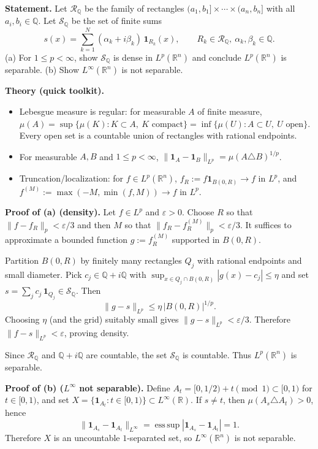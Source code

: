 \begin{problem}[CP-III-0010]
\label{prob:cp-iii-0010}
\textbf{Statement.}
	Let $\mathcal R_{\mathbb Q}$ be the family of rectangles $(a_1,b_1]\times\cdots\times(a_n,b_n]$ with all $a_i,b_i\in\mathbb Q$.
	Let $\mathcal S_{\mathbb Q}$ be the set of finite sums
	\[
	s(x)=\sum_{k=1}^{N}(\alpha_k+i\beta_k)\,\mathbf 1_{R_k}(x),
	\qquad R_k\in\mathcal R_{\mathbb Q},\ \alpha_k,\beta_k\in\mathbb Q.
	\]
	(a) For $1\le p<\infty$, show $\mathcal S_{\mathbb Q}$ is dense in $L^p(\mathbb R^n)$ and conclude $L^p(\mathbb R^n)$ is separable.
	(b) Show $L^\infty(\mathbb R^n)$ is not separable.


	\textbf{Theory (quick toolkit).}
	\begin{itemize}
		\item Lebesgue measure is regular: for measurable $A$ of finite measure,
		$\mu(A)=\sup\{\mu(K):K\subset A,\ K\text{ compact}\}=\inf\{\mu(U):A\subset U,\ U\text{ open}\}$.
		Every open set is a countable union of rectangles with rational endpoints.
		\item For measurable $A,B$ and $1\le p<\infty$,
		$\|\mathbf 1_A-\mathbf 1_B\|_{L^p}=\mu(A\triangle B)^{1/p}$.
		\item Truncation/localization: for $f\in L^p(\mathbb R^n)$, $f_R:=f\mathbf 1_{B(0,R)}\to f$ in $L^p$,
		and $f^{(M)}:=\max(-M,\min(f,M))\to f$ in $L^p$.
	\end{itemize}


	\textbf{Proof of (a) (density).}
	Let $f\in L^{p}$ and $\varepsilon>0$.
	Choose $R$ so that $\|f-f_R\|_{p}<\varepsilon/3$ and then $M$ so that $\|f_R-f_R^{(M)}\|_{p}<\varepsilon/3$.
	It suffices to approximate a bounded function $g:=f_R^{(M)}$ supported in $B(0,R)$.

	Partition $B(0,R)$ by finitely many rectangles $Q_j$ with rational endpoints and small diameter.
	Pick $c_j\in\mathbb Q+i\mathbb Q$ with $\sup_{x\in Q_j\cap B(0,R)}|g(x)-c_j|\le\eta$ and set
	$s=\sum_j c_j\,\mathbf 1_{Q_j}\in\mathcal S_{\mathbb Q}$.
	Then
	\[
	\|g-s\|_{L^p}\le \eta\,|B(0,R)|^{1/p}.
	\]
	Choosing $\eta$ (and the grid) suitably small gives $\|g-s\|_{L^p}<\varepsilon/3$.
	Therefore $\|f-s\|_{L^p}<\varepsilon$, proving density.

	Since $\mathcal R_{\mathbb Q}$ and $\mathbb Q+i\mathbb Q$ are countable, the set $\mathcal S_{\mathbb Q}$ is countable.
	Thus $L^p(\mathbb R^n)$ is separable.

	\medskip

	\textbf{Proof of (b) ($L^\infty$ not separable).}
	Define $A_t=[0,1/2)+t \pmod 1\subset[0,1)$ for $t\in[0,1)$, and set $X=\{\mathbf 1_{A_t}: t\in[0,1)\}\subset L^\infty(\mathbb R)$.
	If $s\ne t$, then $\mu(A_s\triangle A_t)>0$, hence
	\[
	\|\mathbf 1_{A_s}-\mathbf 1_{A_t}\|_{L^\infty}
	= \operatorname*{ess\,sup} |\mathbf 1_{A_s}-\mathbf 1_{A_t}| = 1 .
	\]
	Therefore $X$ is an uncountable $1$-separated set, so $L^\infty(\mathbb R^n)$ is not separable.



\end{problem}
